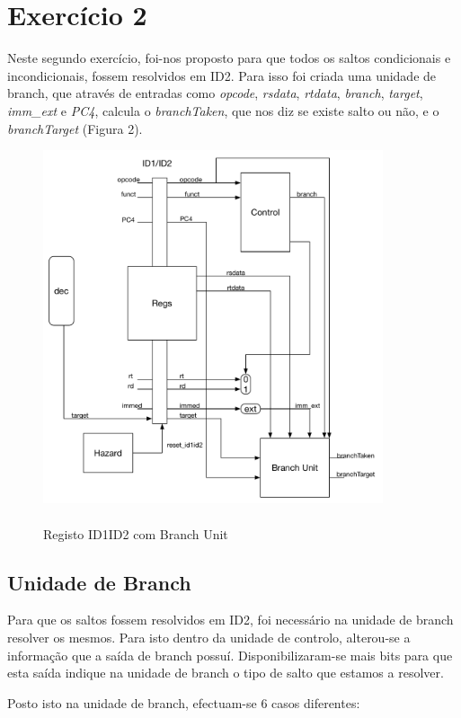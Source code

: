\documentclass[pdftex,12pt,a4paper]{report}
\begin{document}
\newpage
\section{Exercício 2}

Neste segundo exercício, foi-nos proposto para que todos os saltos condicionais e incondicionais, fossem resolvidos em ID2. Para isso foi criada uma unidade de branch, que através de entradas como \textit{opcode}, \textit{rsdata}, \textit{rtdata}, \textit{branch}, \textit{target}, \textit{imm\_ext} e \textit{PC4}, calcula o \textit{branchTaken}, que nos diz se existe salto ou não, e o \textit{branchTarget} (Figura 2).

\begin{figure}[!htb]
\center
 \includegraphics[width=100mm,scale=1]{ID1ID2ex2.pdf}
 \caption{\\Registo ID1ID2 com Branch Unit}\label{fig:eer}
\end{figure}

\subsection{Unidade de Branch}

Para que os saltos fossem resolvidos em ID2, foi necessário na unidade de branch resolver os mesmos. Para isto dentro da unidade de controlo, alterou-se a informação que a saída de branch possuí. Disponibilizaram-se mais bits para que esta saída indique na unidade de branch o tipo de salto que estamos a resolver.

Posto isto na unidade de branch, efectuam-se 6 casos diferentes:
\end{document}

